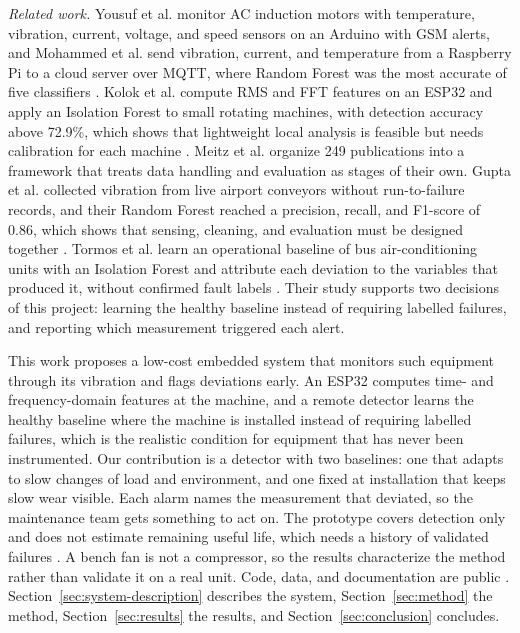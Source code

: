 \documentclass[english,hidelinks]{sbrt}
\begin{document}
\textit{Related work.} Yousuf et al. monitor AC induction motors with temperature, vibration, current, voltage, and speed sensors on an Arduino with GSM alerts, and Mohammed et al. send vibration, current, and temperature from a Raspberry Pi to a cloud server over MQTT, where Random Forest was the most accurate of five classifiers \cite{yousuf2024iot,mohammed2023iot}. Kolok et al. compute RMS and FFT features on an ESP32 and apply an Isolation Forest to small rotating machines, with detection accuracy above 72.9\%, which shows that lightweight local analysis is feasible but needs calibration for each machine \cite{kolok2025lowcost}. Meitz et al. organize 249 publications into a framework that treats data handling and evaluation as stages of their own. Gupta et al. collected vibration from live airport conveyors without run-to-failure records, and their Random Forest reached a precision, recall, and F1-score of 0.86, which shows that sensing, cleaning, and evaluation must be designed together \cite{meitz2025pdmframework,gupta2023baggage}. Tormos et al. learn an operational baseline of bus air-conditioning units with an Isolation Forest and attribute each deviation to the variables that produced it, without confirmed fault labels \cite{tormos2026hvacxai}. Their study supports two decisions of this project: learning the healthy baseline instead of requiring labelled failures, and reporting which measurement triggered each alert.

This work proposes a low-cost embedded system that monitors such equipment through its vibration and flags deviations early. An ESP32 computes time- and frequency-domain features at the machine, and a remote detector learns the healthy baseline where the machine is installed instead of requiring labelled failures, which is the realistic condition for equipment that has never been instrumented. Our contribution is a detector with two baselines: one that adapts to slow changes of load and environment, and one fixed at installation that keeps slow wear visible. Each alarm names the measurement that deviated, so the maintenance team gets something to act on. The prototype covers detection only and does not estimate remaining useful life, which needs a history of validated failures \cite{meitz2025pdmframework}. A bench fan is not a compressor, so the results characterize the method rather than validate it on a real unit. Code, data, and documentation are public \cite{repo}. Section~\ref{sec:system-description} describes the system, Section~\ref{sec:method} the method, Section~\ref{sec:results} the results, and Section~\ref{sec:conclusion} concludes.
\end{document}

